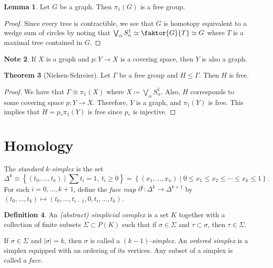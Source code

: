 \documentclass[10pt,letterpaper,cm]{nupset}
\theoremstyle{definition}
\newtheorem{definition}{Definition}[subsection]
\newtheorem{note}[definition]{Note}
\theoremstyle{theorem}
\newtheorem{theorem}[definition]{Theorem}
\newtheorem{lemma}[definition]{Lemma}
\theoremstyle{remark}
\newcommand{\1}{\mathbb{1}}
\newcommand{\0}{\vec 0}
\begin{document}
\begin{lemma}
Let $G$ be a graph.  Then $\pi_1(G)$ is a free group.
\end{lemma}
\begin{proof}
Since every tree is contractible, we see that $G$ is homotopy equivalent to a wedge sum of circles by noting that $\bigvee_{\alpha} S_{\alpha}^1 \simeq \faktor{G}{T}\simeq G$ where $T$ is a maximal tree contained in $G$. 
\end{proof}

\begin{note}
If $X$ is a graph and $p: Y \to X$ is a covering space, then $Y$ is also a graph. 
\end{note}

\begin{theorem}[Nielsen-Schreier]
Let $\Gamma$ be a free group and $H\leq \Gamma$. Then $H$ is free. 
\end{theorem}
\begin{proof}
We have that $\Gamma \cong \pi_1(X)$ where $X\coloneqq  \bigvee_{\alpha} S_{\alpha}^1$. Also, $H$ corresponds to some covering space $p: Y \to X$. Therefore, $Y$ is a graph, and $\pi_1(Y)$ is free. This implies that $H= p_{\ast}\pi_1(Y)$ is free since $p_{\ast}$ is injective. 
\end{proof}

\section{Homology} 

The \textit{standard $k$-simplex} is the set $$  \Delta^k \equiv \left\{(t_0, \ldots, t_k) \mid \sum t_i = 1, \ t_i \geq 0 \right\} = \left\{(x_1, \ldots, x_n) \mid 0\leq x_1 \leq x_2 \leq \cdots \leq x_k \leq 1 \right\} .$$
For each $i=0, \ldots, k+1$, define the \textit{face map} $\partial^i : \Delta^k \to \Delta^{k+1}$ by $(t_0, \ldots, t_k) \mapsto (t_0, \ldots, t_{i-1}, 0, t_i, \ldots, t_k)$.

\begin{definition} 
 An \textit{(abstract) simplicial complex} is a set $K$ together with a collection of finite subsets $\Sigma \subset P(K)$ such that if $\sigma \in \Sigma$ and $\tau \subset \sigma$, then $\tau \in \Sigma$. 
 
 If $\sigma \in \Sigma$ and $\left\lvert{\sigma}\right\rvert= k$, then $\sigma$ is called a \textit{$(k-1)$-simplex}.  An \textit{ordered simplex} is a simplex equipped with an ordering of its vertices.  Any subset of a simplex is called a \textit{face}.
\end{definition}
\end{document}
